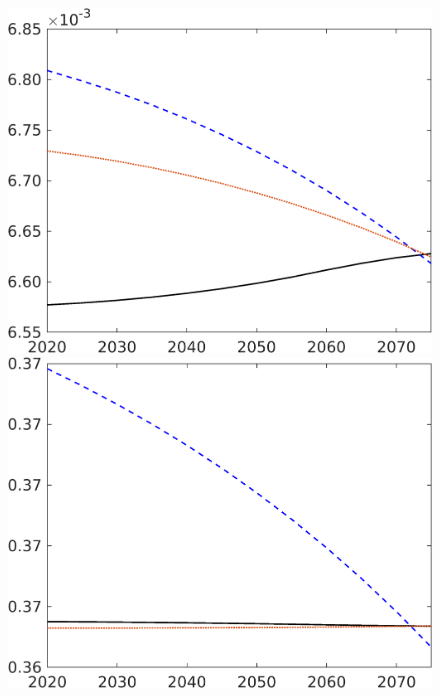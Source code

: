 \begin{figure}[h!!]
\begin{minipage}[]{0.32\textwidth}
	\end{minipage}
	\begin{minipage}[]{0.32\textwidth}
		\includegraphics[width=1\textwidth]{../../codding_model/own_basedOnFried/optimalPol_elastS_DisuSci/figures/all_1705/Lf_CompEffOPT_NOT_NoTaus_spillover0_noskill1_sep1_BN0_ineq0_red0_etaa0.79_lgd0.png}
	\end{minipage}
	\begin{minipage}[]{0.32\textwidth}
		\includegraphics[width=1\textwidth]{../../codding_model/own_basedOnFried/optimalPol_elastS_DisuSci/figures/all_1705/Ln_CompEffOPT_NOT_NoTaus_spillover0_noskill1_sep1_BN0_ineq0_red0_etaa0.79_lgd0.png}

\end{minipage}
\end{figure}
